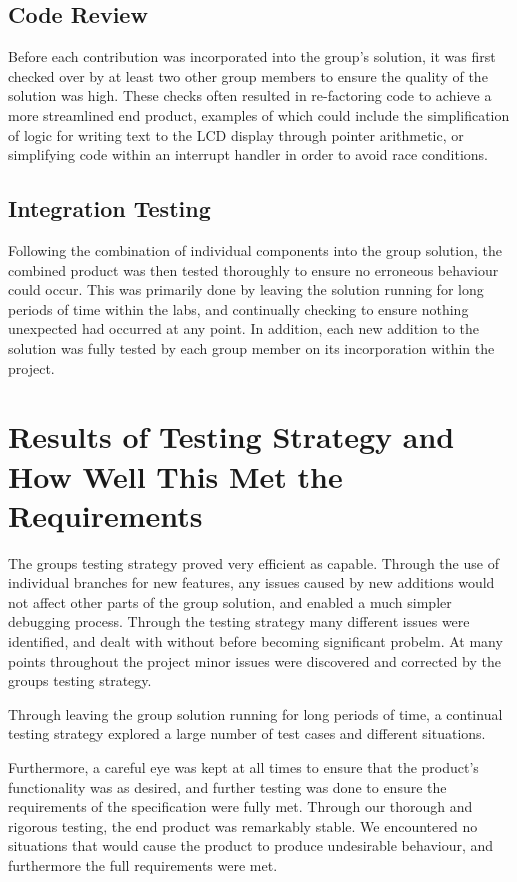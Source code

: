 \subsection*{Code Review}

Before each contribution was incorporated into the group's solution, it was 
first checked over by at least two other group members to ensure the quality of 
the solution was high. These checks often resulted in re-factoring code to 
achieve a more streamlined end product, examples of which could include the 
simplification of logic for writing text to the LCD display through pointer 
arithmetic, or simplifying code within an interrupt handler in order to avoid 
race conditions. 

\subsection*{Integration Testing}

Following the combination of individual components into the group solution, the 
combined product was then tested thoroughly to ensure no erroneous behaviour 
could occur. This was primarily done by leaving the solution running for long 
periods of time within the labs, and continually checking to ensure nothing unexpected 
had occurred at any point.
In addition, each new addition to the solution was fully tested by each group 
member on its incorporation within the project. 

\section{Results of Testing Strategy and How Well This Met the Requirements}

The groups testing strategy proved very efficient as capable. Through the use 
of individual branches for new features, any issues caused by new additions would 
not affect other parts of the group solution, and enabled a much simpler debugging 
process.  
Through the testing strategy many different issues were identified, and dealt 
with without before becoming significant probelm. 
At many points throughout the project minor issues were discovered and corrected 
by the groups testing strategy. 

Through leaving the group solution running for long periods of time, a continual 
testing strategy explored a large number of test cases and different situations.

Furthermore, a careful eye was kept at all times to ensure that the product's
functionality was as desired, and further testing was done to ensure the 
requirements of the specification were fully met.
Through our thorough and rigorous testing, the end product was remarkably stable. 
We encountered no situations that would cause the product to produce undesirable 
behaviour, and furthermore the full requirements were met.

